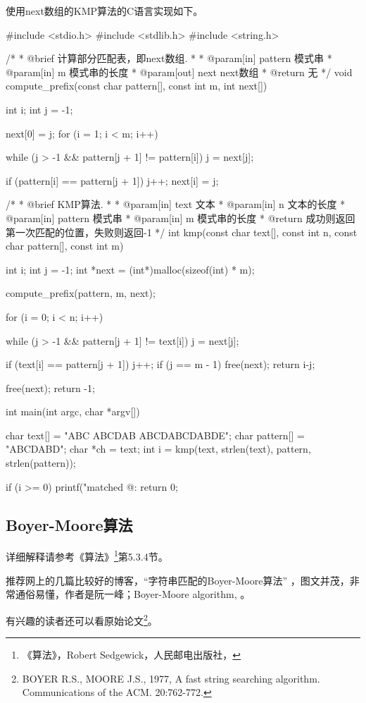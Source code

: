 使用next数组的KMP算法的C语言实现如下。
\begin{Codex}[label=kmp.c]
#include <stdio.h>
#include <stdlib.h>
#include <string.h>

/*
 * @brief 计算部分匹配表，即next数组.
 *
 * @param[in] pattern 模式串
 * @param[in] m 模式串的长度
 * @param[out] next next数组
 * @return 无
 */
void compute_prefix(const char pattern[], const int m, int next[]) {
	int i;
    int j = -1;

	next[0] = j;
	for (i = 1; i < m; i++) {
		while (j > -1 && pattern[j + 1] != pattern[i]) j = next[j];

		if (pattern[i] == pattern[j + 1]) j++;
		next[i] = j;
	}
}

/*
 * @brief KMP算法.
 *
 * @param[in] text 文本
 * @param[in] n 文本的长度
 * @param[in] pattern 模式串
 * @param[in] m 模式串的长度
 * @return 成功则返回第一次匹配的位置，失败则返回-1
 */
int kmp(const char text[], const int n, const char pattern[], const int m) {
	int i;
    int j = -1;
    int *next = (int*)malloc(sizeof(int) * m);

    compute_prefix(pattern, m, next);

	for (i = 0; i < n; i++) {
		while (j > -1 && pattern[j + 1] != text[i]) j = next[j];

		if (text[i] == pattern[j + 1]) j++;
		if (j == m - 1) {
			free(next);
			return i-j;
		}
	}

	free(next);
	return -1;
}


int main(int argc, char *argv[]) {
	char text[] = "ABC ABCDAB ABCDABCDABDE";
	char pattern[] = "ABCDABD";
    char *ch = text;
	int i = kmp(text, strlen(text), pattern, strlen(pattern));

    if (i >= 0) printf("matched @: %
	return 0;
}
\end{Codex}


\subsection{Boyer-Moore算法}
详细解释请参考《算法》\footnote{《算法》，Robert Sedgewick，人民邮电出版社，}第5.3.4节。

推荐网上的几篇比较好的博客，“字符串匹配的Boyer-Moore算法” ，图文并茂，非常通俗易懂，作者是阮一峰；Boyer-Moore algorithm, 。

有兴趣的读者还可以看原始论文\footnote{BOYER R.S., MOORE J.S., 1977, A fast string searching algorithm. Communications of the ACM. 20:762-772.}。


